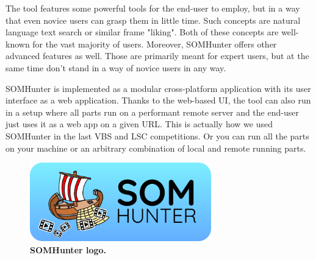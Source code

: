 The tool features some powerful tools for the end-user to employ, but in a way that even novice users can grasp them in little time. Such concepts are natural language text search or similar frame "liking". Both of these concepts are well-known for the vast majority of users. Moreover,  SOMHunter offers other advanced features as well. Those are primarily meant for expert users, but at the same time don't stand in a way of novice users in any way.

SOMHunter is implemented as a modular cross-platform application with its user interface as a web application. Thanks to the web-based UI, the tool can also run in a setup where all parts run on a performant remote server and the end-user just uses it as a web app on a given URL. This is actually how we used SOMHunter in the last VBS and LSC competitions. Or you can run all the parts on your machine or an arbitrary combination of local and remote running parts.

\begin{figure}[b]
	\centering
	\includegraphics[width=0.7\textwidth]{img/somhunter-logo.png}
  \caption{\textbf{SOMHunter logo.}}
	\label{fig:logo}
\end{figure}
